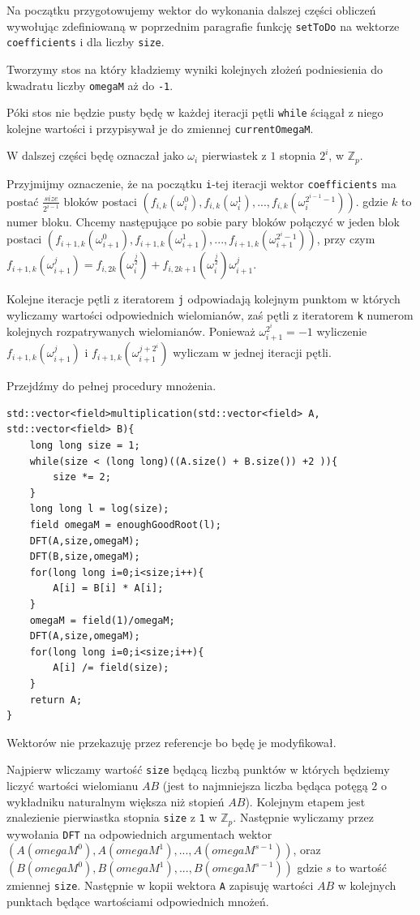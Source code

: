 \documentclass{article}
\begin{document}
Na początku przygotowujemy wektor do wykonania dalszej części obliczeń wywołując zdefiniowaną w poprzednim paragrafie funkcję \texttt{setToDo} na wektorze 
\texttt{coefficients} i dla liczby \texttt{size}. 

Tworzymy stos na który kładziemy wyniki kolejnych złożeń podniesienia do kwadratu liczby \texttt{omegaM} aż do \texttt{-1}.

Póki stos nie będzie pusty będę w każdej iteracji pętli \texttt{while} ściągał z niego kolejne wartości i przypisywał je do zmiennej \texttt{currentOmegaM}.

W dalszej części będę oznaczał jako $\omega_i$ pierwiastek z $1$ stopnia $2^i$, w $\mathbb{Z}_p$.

Przyjmijmy oznaczenie, że na początku \texttt{i}-tej iteracji wektor \texttt{coefficients} ma postać $\frac{size}{2^{i-1}}$ bloków postaci
$(f_{i,k}(\omega_i^0), f_{i,k}(\omega_i^1), ...,f_{i,k}(\omega^{2^{i-1}-1}_i))$. gdzie $k$ to numer bloku. Chcemy
następujące po sobie pary bloków połączyć w jeden blok postaci $(f_{i+1,k}(\omega_{i+1}^0),f_{i+1,k}(\omega_{i+1}^1),...,
f_{i+1,k}(\omega^{2^{i}-1}_{i+1}))$, przy czym 
$f_{i+1,k}(\omega_{i+1}^j) = f_{i,2k}(\omega_{i}^\frac{j}{2})+f_{i,2k+1}(\omega_{i}^{\frac{j}{2}})\omega_{i+1}^j$. 

Kolejne iteracje pętli z iteratorem \texttt{j} odpowiadają kolejnym punktom w których wyliczamy wartości odpowiednich wielomianów, zaś pętli z iteratorem 
\texttt{k}
numerom kolejnych rozpatrywanych wielomianów. Ponieważ $\omega_{i+1}^{2^i}=-1$ wyliczenie $f_{i+1,k}(\omega_{i+1}^{j})$ i $f_{i+1,k}(\omega_{i+1}^{j+2^i})$ 
wyliczam w jednej iteracji pętli.


Przejdźmy do pełnej procedury mnożenia. 
\begin{verbatim}
std::vector<field>multiplication(std::vector<field> A, std::vector<field> B){
    long long size = 1;
    while(size < (long long)((A.size() + B.size()) +2 )){
        size *= 2;
    }
    long long l = log(size);
    field omegaM = enoughGoodRoot(l);
    DFT(A,size,omegaM);  
    DFT(B,size,omegaM);
    for(long long i=0;i<size;i++){
        A[i] = B[i] * A[i]; 
    }
    omegaM = field(1)/omegaM;
    DFT(A,size,omegaM);
    for(long long i=0;i<size;i++){
        A[i] /= field(size);
    } 
    return A;
}
\end{verbatim}
Wektorów nie przekazuję przez referencje bo będę je modyfikował.

Najpierw wliczamy wartość \texttt{size} będącą liczbą punktów w których będziemy liczyć wartości wielomianu $AB$ (jest to najmniejsza liczba będąca potęgą 
$2$ o wykładniku naturalnym większa niż stopień $AB$). Kolejnym etapem jest znalezienie pierwiastka stopnia \texttt{size} z \texttt{1} w $\mathbb{Z}_p$. 
Następnie wyliczamy przez wywołania \texttt{DFT} na odpowiednich argumentach wektor $(A(omegaM^0),A(omegaM^1),...,A(omegaM^{s-1}))$, 
oraz $(B(omegaM^0),B(omegaM^1),...,B(omegaM^{s-1}))$ gdzie $s$
to wartość zmiennej \texttt{size}. Następnie w kopii wektora \texttt{A} zapisuję wartości $AB$ w kolejnych punktach będące wartościami odpowiednich 
mnożeń.
\end{document}
